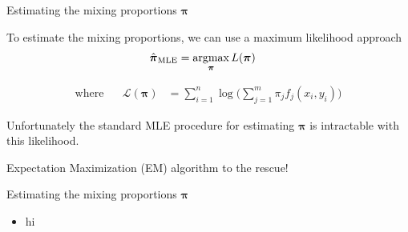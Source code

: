 \documentclass{beamer}
\newcommand{\eqn}[1]{\begin{align*}
#1
\end{align*}}
\newcommand{\vect}[1]{\boldsymbol{\mathbf{#1}}}
\newcommand{\script}[1]{\mathcal{#1}}
\newcommand{\argmax}{\operatornamewithlimits{argmax}}
\newcommand{\leftlbl}[1]{\mbox{#1} \;\;\;\;\;\;}
\newcommand{\vp}{\vect{\pi}}
\newcommand{\vph}{\hat{\vect{\pi}}}
\newcommand{\sumn}{\sum^n_{i=1}}
\newcommand{\summ}{\sum^m_{j=1}}
\newcommand{\fab}{f_j}
\begin{document}
\begin{frame}{Estimating the mixing proportions $\vect{\pi}$}
	
	To estimate the mixing proportions, we can use a maximum likelihood approach
	\eqn{
		\vph_{\text{MLE}} &= \argmax_{\vp} L(\vect{\pi})
	}
	
	
	
	\eqn{
		\leftlbl{where} \script{L}(\vect{\pi}) &= \sumn \log \Big( \summ \pi_j \fab(x_i,y_i)  \Big)
	}
	
	Unfortunately the standard MLE procedure for estimating $\vp$ is intractable with this likelihood.\newline
	
	Expectation Maximization (EM) algorithm to the rescue!
	
	
	
\end{frame}
\begin{frame}[shrink]{Estimating the mixing proportions $\vect{\pi}$}
	
	\begin{itemize}
		\item hi
	\end{itemize}
	
\end{frame}
\end{document}
